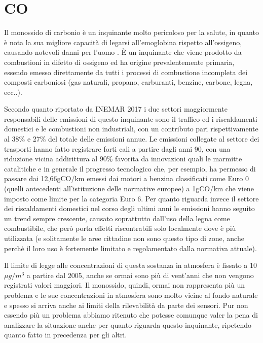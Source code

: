 \documentclass[a4paper,12pt]{report}
\begin{document}
\section{CO}
Il monossido di carbonio è un inquinante molto pericoloso per la salute, in quanto è nota la sua migliore capacità di legarsi all'emoglobina rispetto all'ossigeno, causando notevoli danni per l'uomo \cite{kao2005carbon}.
È un inquinante che viene prodotto da combustioni in difetto di ossigeno ed ha origine prevalentemente primaria, essendo emesso direttamente da tutti i processi di combustione incompleta dei composti carboniosi (gas naturali, propano, carburanti, benzine, carbone, legna, ecc..).

Secondo quanto riportato da INEMAR 2017 i due settori maggiormente responsabili delle emissioni di questo inquinante sono il traffico ed i riscaldamenti domestici e le combustioni non industriali, con un contributo pari rispettivamente al 38\% e 27\% del totale delle emissioni annue. Le emissioni collegate al settore dei trasporti hanno fatto registrare forti cali a partire dagli anni 90, con una riduzione vicina addirittura al 90\% favorita da innovazioni quali le marmitte catalitiche e in generale il progresso tecnologico che, per esempio, ha permesso di passare dai 12,66gCO/km emessi dai motori a benzina classificati come Euro 0 (quelli antecedenti all'istituzione delle normative europee) a 1gCO/km che viene imposto come limite per la categoria Euro 6.
Per quanto riguarda invece il settore dei riscaldamenti domestici nel corso degli ultimi anni le emissioni hanno seguito un trend sempre crescente, causato soprattutto dall'uso della legna come combustibile, che però porta effetti riscontrabili solo localmente dove è più utilizzata (e solitamente le aree cittadine non sono questo tipo di zone, anche perchè il loro uso è fortemente limitato e regolamentato dalla normativa attuale).

Il limite di legge alle concentrazioni di questa sostanza in atmosfera è fissato a 10 $\mu g/m^3$ a partire dal 2005, anche se ormai sono più di vent'anni che non vengono registrati valori maggiori. Il monossido, quindi, ormai non rappresenta più un problema e le sue concentrazioni in atmosfera sono molto vicine al fondo naturale \cite{arpa2018rapporto}
 e spesso si arriva anche ai limiti della rilevabilità da parte dei sensori.
Pur non essendo più un problema abbiamo ritenuto che potesse comunque valer la pena di analizzare la situazione anche per quanto riguarda questo inquinante, ripetendo quanto fatto in precedenza per gli altri.
\end{document}
